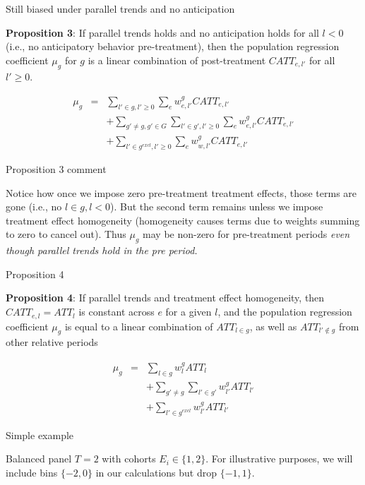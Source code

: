\documentclass{beamer}
\begin{document}
\begin{frame}{Still biased under parallel trends and no anticipation}

\textbf{Proposition 3}: If parallel trends holds and no anticipation holds for all $l<0$ (i.e., no anticipatory behavior pre-treatment), then the population regression coefficient $\mu_g$ for $g$ is a linear combination of post-treatment $CATT_{e,l'}$ for all $l' \geq 0$.

\begin{eqnarray*}
\mu_g &=& \sum_{l' \in g, l' \geq 0} \sum_e w^g_{e,l'} CATT_{e,l'} \\
&&+ \sum_{g' \neq g,g' \in G} \sum_{l' \in g', l' \geq 0} \sum_e w^g_{e,l'} CATT_{e,l'} \\
&&+ \sum_{l' \in g^{excl},l' \geq 0} \sum_e w^g_{w,l'} CATT_{e,l'}
\end{eqnarray*}

\end{frame}

\begin{frame}{Proposition 3 comment}

Notice how once we impose zero pre-treatment treatment effects, those terms are gone (i.e., no $l \in g, l<0$).  But the second term remains unless we impose treatment effect homogeneity (homogeneity causes terms due to weights summing to zero to cancel out). Thus $\mu_g$ may be non-zero for pre-treatment periods \emph{even though parallel trends hold in the pre period.}

\end{frame}

\begin{frame}{Proposition 4}

\textbf{Proposition 4}: If parallel trends and treatment effect homogeneity, then $CATT_{e,l}=ATT_l$ is constant across $e$ for a given $l$, and the population regression coefficient $\mu_g$ is equal to a linear combination of $ATT_{l \in g}$, as well as $ATT_{l' \notin g}$ from other relative periods

\begin{eqnarray*}
\mu_g &=& \sum_{l \in g} w^g_l ATT_l \\
&&+ \sum_{g' \neq g} \sum_{l' \in g'} w^g_{l'} ATT_{l'} \\
&&+ \sum_{l' \in g^{excl}} w^g_{l'}ATT_{l'}
\end{eqnarray*}


\end{frame}

\begin{frame}{Simple example}


Balanced panel $T=2$ with cohorts $E_i \in \{1,2 \}$. For illustrative purposes, we will include bins $\{-2,0\}$ in our calculations but drop $\{-1,1\}$. 


\end{frame}
\end{document}
